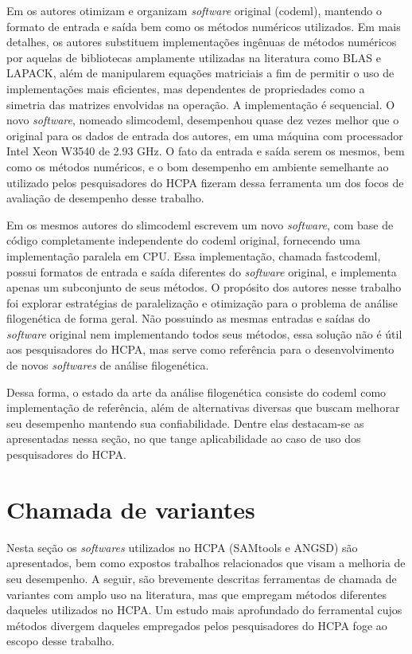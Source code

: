 \documentclass[cic,tc]{iiufrgs}
\begin{document}
Em \cite{schabauer2012slimcodeml} os autores otimizam e organizam \textit{software}
original (codeml), mantendo o formato de entrada e saída bem como os métodos
numéricos utilizados. Em mais detalhes, os autores substituem implementações
ingênuas de métodos numéricos por aquelas de bibliotecas amplamente utilizadas
na literatura como BLAS e LAPACK, além de manipularem equações matriciais a fim
de permitir o uso de implementações mais eficientes, mas dependentes de
propriedades como a simetria das matrizes envolvidas na operação. A
implementação é sequencial. O novo \textit{software}, nomeado slimcodeml, desempenhou
quase dez vezes melhor que o original para os dados de entrada dos autores, em
uma máquina com processador Intel Xeon W3540 de 2.93 GHz. O fato da entrada e
saída serem os mesmos, bem como os métodos numéricos, e o bom desempenho em
ambiente semelhante ao utilizado pelos pesquisadores do HCPA fizeram dessa
ferramenta um dos focos de avaliação de desempenho desse trabalho.

Em \cite{valle2014optimization} os mesmos autores do slimcodeml escrevem um
novo \textit{software}, com base de código completamente independente do codeml
original, fornecendo uma implementação paralela em CPU. Essa implementação,
chamada fastcodeml, possui formatos de entrada e saída diferentes do \textit{software}
original, e implementa apenas um subconjunto de seus métodos. O propósito dos
autores nesse trabalho foi explorar estratégias de paralelização e otimização
para o problema de análise filogenética de forma geral. Não possuindo as mesmas
entradas e saídas do \textit{software} original nem implementando todos seus métodos,
essa solução não é útil aos pesquisadores do HCPA, mas serve como referência
para o desenvolvimento de novos \textit{softwares} de análise filogenética.

Dessa forma, o estado da arte da análise filogenética consiste do codeml como
implementação de referência, além de alternativas diversas que buscam melhorar
seu desempenho mantendo sua confiabilidade. Dentre elas destacam-se as
apresentadas nessa seção, no que tange aplicabilidade ao caso de uso dos
pesquisadores do HCPA.

\section{Chamada de variantes}
\label{sec:callant}

Nesta seção os \textit{softwares} utilizados no HCPA (SAMtools e ANGSD) são
apresentados, bem como expostos trabalhos relacionados que visam a melhoria de
seu desempenho. A seguir, são brevemente descritas ferramentas de chamada de
variantes com amplo uso na literatura, mas que empregam métodos diferentes
daqueles utilizados no HCPA. Um estudo mais aprofundado do ferramental cujos
métodos divergem daqueles empregados pelos pesquisadores do HCPA foge ao escopo
desse trabalho.
\end{document}
